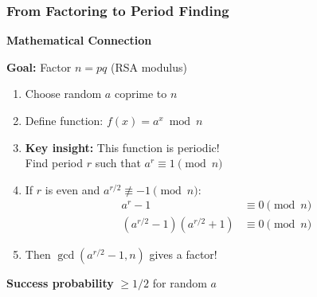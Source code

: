 \documentclass[aspectratio=169,10pt]{beamer}
\newcommand{\teaching}[1]{}
\newcommand{\slideheader}[1]{\frametitle{#1}}
\theoremstyle{plain}
\begin{document}
\begin{frame}
  \slideheader{From Factoring to Period Finding}
  
  \begin{center}
    \textbf{\large Mathematical Connection}
  \end{center}
  
  \begin{blueBox}
    \textbf{Goal:} Factor $n = pq$ (RSA modulus)
  \end{blueBox}
  
  \vspace{0.3cm}
  
  \begin{enumerate}
    \item Choose random $a$ coprime to $n$
    
    \item Define function: $f(x) = a^x \bmod n$
    
    \item \textbf{Key insight:} This function is periodic!\\
    Find period $r$ such that $a^r \equiv 1 \pmod{n}$
    
    \item If $r$ is even and $a^{r/2} \not\equiv -1 \pmod{n}$:
    \begin{align}
      a^r - 1 &\equiv 0 \pmod{n}\\
      (a^{r/2} - 1)(a^{r/2} + 1) &\equiv 0 \pmod{n}
    \end{align}
    
    \item Then $\gcd(a^{r/2} - 1, n)$ gives a factor!
  \end{enumerate}
  
  \vspace{0.3cm}
  
  \begin{greenBox}
    \textbf{Success probability} $\geq 1/2$ for random $a$
  \end{greenBox}
  
  \teaching{Show the mathematical reduction clearly}
\end{frame}
\end{document}
